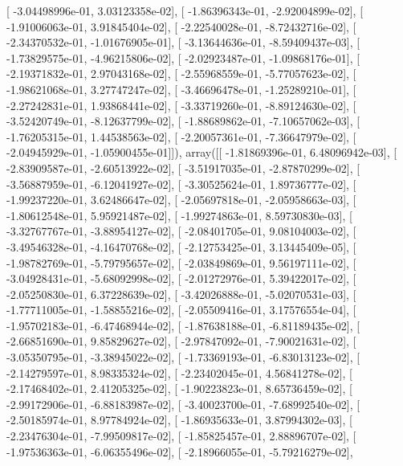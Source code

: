 \documentclass{article}
\begin{document}
       [ -3.04498996e-01,   3.03123358e-02],
       [ -1.86396343e-01,  -2.92004899e-02],
       [ -1.91006063e-01,   3.91845404e-02],
       [ -2.22540028e-01,  -8.72432716e-02],
       [ -2.34370532e-01,  -1.01676905e-01],
       [ -3.13644636e-01,  -8.59409437e-03],
       [ -1.73829575e-01,  -4.96215806e-02],
       [ -2.02923487e-01,  -1.09868176e-01],
       [ -2.19371832e-01,   2.97043168e-02],
       [ -2.55968559e-01,  -5.77057623e-02],
       [ -1.98621068e-01,   3.27747247e-02],
       [ -3.46696478e-01,  -1.25289210e-01],
       [ -2.27242831e-01,   1.93868441e-02],
       [ -3.33719260e-01,  -8.89124630e-02],
       [ -3.52420749e-01,  -8.12637799e-02],
       [ -1.88689862e-01,  -7.10657062e-03],
       [ -1.76205315e-01,   1.44538563e-02],
       [ -2.20057361e-01,  -7.36647979e-02],
       [ -2.04945929e-01,  -1.05900455e-01]]), array([[ -1.81869396e-01,   6.48096942e-03],
       [ -2.83909587e-01,  -2.60513922e-02],
       [ -3.51917035e-01,  -2.87870299e-02],
       [ -3.56887959e-01,  -6.12041927e-02],
       [ -3.30525624e-01,   1.89736777e-02],
       [ -1.99237220e-01,   3.62486647e-02],
       [ -2.05697818e-01,  -2.05958663e-03],
       [ -1.80612548e-01,   5.95921487e-02],
       [ -1.99274863e-01,   8.59730830e-03],
       [ -3.32767767e-01,  -3.88954127e-02],
       [ -2.08401705e-01,   9.08104003e-02],
       [ -3.49546328e-01,  -4.16470768e-02],
       [ -2.12753425e-01,   3.13445409e-05],
       [ -1.98782769e-01,  -5.79795657e-02],
       [ -2.03849869e-01,   9.56197111e-02],
       [ -3.04928431e-01,  -5.68092998e-02],
       [ -2.01272976e-01,   5.39422017e-02],
       [ -2.05250830e-01,   6.37228639e-02],
       [ -3.42026888e-01,  -5.02070531e-03],
       [ -1.77711005e-01,  -1.58855216e-02],
       [ -2.05509416e-01,   3.17576554e-04],
       [ -1.95702183e-01,  -6.47468944e-02],
       [ -1.87638188e-01,  -6.81189435e-02],
       [ -2.66851690e-01,   9.85829627e-02],
       [ -2.97847092e-01,  -7.90021631e-02],
       [ -3.05350795e-01,  -3.38945022e-02],
       [ -1.73369193e-01,  -6.83013123e-02],
       [ -2.14279597e-01,   8.98335324e-02],
       [ -2.23402045e-01,   4.56841278e-02],
       [ -2.17468402e-01,   2.41205325e-02],
       [ -1.90223823e-01,   8.65736459e-02],
       [ -2.99172906e-01,  -6.88183987e-02],
       [ -3.40023700e-01,  -7.68992540e-02],
       [ -2.50185974e-01,   8.97784924e-02],
       [ -1.86935633e-01,   3.87994302e-03],
       [ -2.23476304e-01,  -7.99509817e-02],
       [ -1.85825457e-01,   2.88896707e-02],
       [ -1.97536363e-01,  -6.06355496e-02],
       [ -2.18966055e-01,  -5.79216279e-02],
\end{document}
